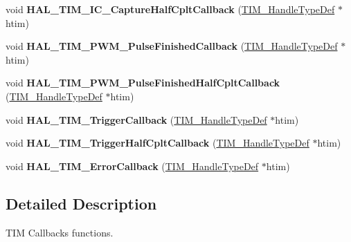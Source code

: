 \begin{DoxyCompactItemize}
void {\bfseries H\+A\+L\+\_\+\+T\+I\+M\+\_\+\+I\+C\+\_\+\+Capture\+Half\+Cplt\+Callback} (\mbox{\hyperlink{struct_t_i_m___handle_type_def}{T\+I\+M\+\_\+\+Handle\+Type\+Def}} $\ast$htim)
\item 
\mbox{\label{group___t_i_m___exported___functions___group9_ga07e5fc4d223b16bec2fd6bed547cf91d}} 
void {\bfseries H\+A\+L\+\_\+\+T\+I\+M\+\_\+\+P\+W\+M\+\_\+\+Pulse\+Finished\+Callback} (\mbox{\hyperlink{struct_t_i_m___handle_type_def}{T\+I\+M\+\_\+\+Handle\+Type\+Def}} $\ast$htim)
\item 
\mbox{\label{group___t_i_m___exported___functions___group9_gaf669ea0eacb07d5fee199704b612841f}} 
void {\bfseries H\+A\+L\+\_\+\+T\+I\+M\+\_\+\+P\+W\+M\+\_\+\+Pulse\+Finished\+Half\+Cplt\+Callback} (\mbox{\hyperlink{struct_t_i_m___handle_type_def}{T\+I\+M\+\_\+\+Handle\+Type\+Def}} $\ast$htim)
\item 
\mbox{\label{group___t_i_m___exported___functions___group9_ga189577c72b1963671b26820d8161d678}} 
void {\bfseries H\+A\+L\+\_\+\+T\+I\+M\+\_\+\+Trigger\+Callback} (\mbox{\hyperlink{struct_t_i_m___handle_type_def}{T\+I\+M\+\_\+\+Handle\+Type\+Def}} $\ast$htim)
\item 
\mbox{\label{group___t_i_m___exported___functions___group9_ga6fb4827960b3fcbc72f81152c3c7a2c3}} 
void {\bfseries H\+A\+L\+\_\+\+T\+I\+M\+\_\+\+Trigger\+Half\+Cplt\+Callback} (\mbox{\hyperlink{struct_t_i_m___handle_type_def}{T\+I\+M\+\_\+\+Handle\+Type\+Def}} $\ast$htim)
\item 
\mbox{\label{group___t_i_m___exported___functions___group9_ga6f0868af383d592940700dbb52fac016}} 
void {\bfseries H\+A\+L\+\_\+\+T\+I\+M\+\_\+\+Error\+Callback} (\mbox{\hyperlink{struct_t_i_m___handle_type_def}{T\+I\+M\+\_\+\+Handle\+Type\+Def}} $\ast$htim)
\end{DoxyCompactItemize}


\subsection{Detailed Description}
T\+IM Callbacks functions. 


